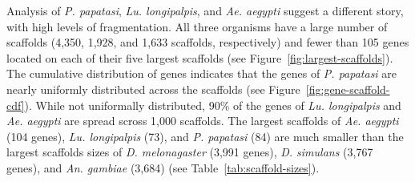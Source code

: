 Analysis of \emph{P. papatasi}, \emph{Lu. longipalpis}, and \emph{Ae. aegypti} suggest a different story, with high levels of fragmentation.  All three organisms have a large number of scaffolds (4,350, 1,928, and 1,633 scaffolds, respectively) and fewer than 105 genes located on each of their five largest scaffolds (see Figure~\ref{fig:largest-scaffolds}).  The cumulative distribution of genes indicates that the genes of \emph{P. papatasi} are nearly uniformly distributed across the scaffolds (see Figure~\ref{fig:gene-scaffold-cdf}).  While not uniformally distributed, 90\% of the genes of \emph{Lu. longipalpis} and \emph{Ae. aegypti} are spread scross 1,000 scaffolds. The largest scaffolds of \emph{Ae. aegypti} (104 genes), \emph{Lu. longipalpis} (73), and \emph{P. papatasi} (84) are much smaller than the largest scaffolds sizes of \emph{D. melonagaster} (3,991 genes), \emph{D. simulans} (3,767 genes), and \emph{An. gambiae} (3,684) (see Table~\ref{tab:scaffold-sizes}).

